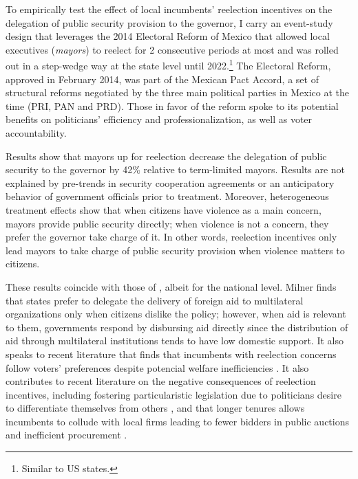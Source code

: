 \documentclass[12pt]{amsart}
\numberwithin{equation}{section}
\theoremstyle{definition}
\theoremstyle{definition}
\theoremstyle{definition}
\begin{document}
   To empirically test the effect of local incumbents' reelection incentives on the delegation of public security provision to the governor, I carry an event-study design that leverages the 2014 Electoral Reform of Mexico that allowed local executives (\emph{mayors}) to reelect for 2 consecutive periods at most and was rolled out in a step-wedge way at the state level until 2022.\footnote{Similar to US states.} The Electoral Reform, approved in February 2014, was part of the Mexican Pact Accord, a set of structural reforms negotiated by the three main political parties in Mexico at the time (PRI, PAN and PRD). Those in favor of the reform spoke to its potential benefits on politicians' efficiency and professionalization, as well as voter accountability. %
     
Results show that mayors up for reelection decrease the delegation of public security to the governor by 42\% relative to term-limited mayors. Results are not explained by pre-trends in security cooperation agreements or an anticipatory behavior of government officials prior to treatment.  Moreover, heterogeneous treatment effects show that when citizens have violence as a main concern, mayors provide public security directly; when violence is not a concern, they prefer the governor take charge of it. In other words, reelection incentives only lead mayors to take charge of public security provision when violence matters to citizens.

These results coincide with those of \citet{milner_2004}, albeit for the national level. Milner \citeyear{milner_2004} finds that states prefer to delegate the delivery of foreign aid to multilateral organizations only when citizens dislike the policy; however, when aid is relevant to them, governments respond by disbursing aid directly since the distribution of aid through multilateral institutions tends to have low domestic support. It also speaks to recent literature that finds that incumbents with reelection concerns follow voters’ preferences despite potencial welfare inefficiencies \citep{pulejo_querubin_2021}. It also contributes to recent literature on the negative consequences of reelection incentives, including fostering  particularistic legislation due to politicians desire to differentiate themselves from others \citep{motolinia_2020}, and that longer tenures allows incumbents to collude with local firms leading to fewer bidders in public auctions and inefficient procurement \citep{coviello_etal_2017}. 
             
\end{document}
